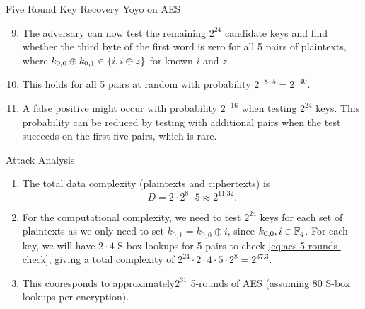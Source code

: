 \documentclass[notheorems]{beamer}
\theoremstyle{definition}
\theoremstyle{example}
\begin{document}
    \begin{frame}[<+->]{Five Round Key Recovery Yoyo on AES}
        \begin{enumerate}\setcounter{enumi}{8}
            \item The adversary can now test the remaining \(2^{24}\) candidate
            keys and find whether the third byte of the first word is zero for
            all 5 pairs of plaintexts, where \(k_{0, 0} \oplus k_{0, 1} \in
            \{i, i \oplus z\}\) for known \(i\) and \(z\). 
            \item This holds for all 5 pairs at random with probability \(2^{-8
            \cdot 5} = 2^{-40}\). 
            \item A false positive might occur with probability \(2^{-16}\) when
            testing \(2^{24}\) keys. This probability can be reduced by testing
            with additional pairs when the test succeeds on the first five
            pairs, which is rare.
        \end{enumerate} 
    \end{frame}

    \begin{frame}[<+->]{Attack Analysis}
        \begin{enumerate}
            \item The total data complexity (plaintexts and ciphertexts) is
            \begin{equation}
                D = 2 \cdot 2^8 \cdot 5 \approx 2^{11.32}.
            \end{equation}
            \item For the computational complexity, we need to test \(2^{24}\)
            keys for each set of plaintexts as we only need to set \(k_{0, 1} =
            k_{0, 0} \oplus i\), since \(k_{0, 0}, i \in \mathbb F_q\). For each key,
            we will have \(2 \cdot 4\) S-box lookups for 5 pairs to check
            \eqref{eq:aes-5-rounds-check}, giving a total complexity of \(2^{24}
            \cdot 2 \cdot 4 \cdot 5 \cdot 2^8 = 2^{37.3}\).
            \item This cooresponds to approximately\(2^{31}\) 5-rounds of AES
            (assuming 80 S-box lookups per encryption).
        \end{enumerate}        
    \end{frame}
\end{document}
